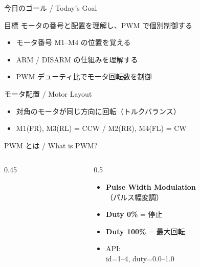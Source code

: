 \begin{frame}{今日のゴール / Today's Goal}
  \begin{block}{目標}
    モータの番号と配置を理解し、PWM で個別制御する
  \end{block}

  \vspace{1em}

  \begin{itemize}
    \item モータ番号 M1--M4 の位置を覚える
    \item ARM / DISARM の仕組みを理解する
    \item PWM デューティ比でモータ回転数を制御
  \end{itemize}
\end{frame}

\begin{frame}{モータ配置 / Motor Layout}
  \begin{center}
    \resizebox{0.38\textwidth}{!}{}
  \end{center}
  \begin{itemize}
    \item 対角のモータが同じ方向に回転（トルクバランス）
    \item M1(FR), M3(RL) = CCW / M2(RR), M4(FL) = CW
  \end{itemize}
\end{frame}

\begin{frame}{PWM とは / What is PWM?}
  \begin{columns}[T]
    \begin{column}{0.45\textwidth}
      \begin{center}
        \resizebox{!}{0.72\textheight}{}
      \end{center}
    \end{column}
    \begin{column}{0.5\textwidth}
      \vspace{1em}
      \begin{itemize}
        \item \textbf{Pulse Width Modulation}\\（パルス幅変調）
        \item \textbf{Duty 0\%} = 停止
        \item \textbf{Duty 100\%} = 最大回転
        \item API: \\
              \small id=1--4, duty=0.0--1.0
      \end{itemize}
    \end{column}
  \end{columns}
\end{frame}

